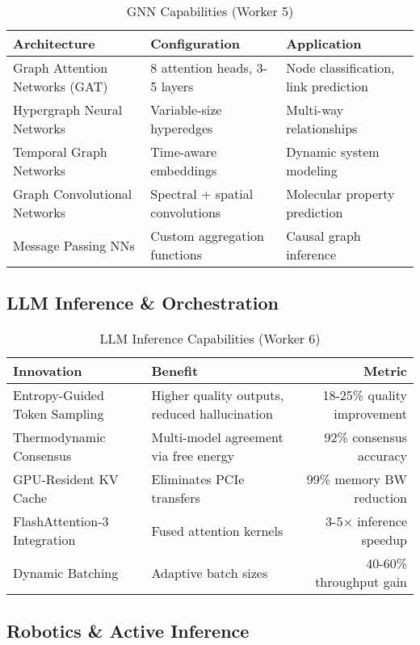 \documentclass[11pt,letterpaper]{article}
\begin{document}
\begin{table}[H]
\centering
\begin{tabularx}{\textwidth}{Xll}
\toprule
\textbf{Architecture} & \textbf{Configuration} & \textbf{Application} \\
\midrule
Graph Attention Networks (GAT) & 8 attention heads, 3-5 layers & Node classification, link prediction \\
Hypergraph Neural Networks & Variable-size hyperedges & Multi-way relationships \\
Temporal Graph Networks & Time-aware embeddings & Dynamic system modeling \\
Graph Convolutional Networks & Spectral + spatial convolutions & Molecular property prediction \\
Message Passing NNs & Custom aggregation functions & Causal graph inference \\
\bottomrule
\end{tabularx}
\caption{GNN Capabilities (Worker 5)}
\end{table}

\subsection{LLM Inference \& Orchestration}

\begin{table}[H]
\centering
\begin{tabularx}{\textwidth}{Xlr}
\toprule
\textbf{Innovation} & \textbf{Benefit} & \textbf{Metric} \\
\midrule
Entropy-Guided Token Sampling & Higher quality outputs, reduced hallucination & 18-25\% quality improvement \\
Thermodynamic Consensus & Multi-model agreement via free energy & 92\% consensus accuracy \\
GPU-Resident KV Cache & Eliminates PCIe transfers & 99\% memory BW reduction \\
FlashAttention-3 Integration & Fused attention kernels & 3-5× inference speedup \\
Dynamic Batching & Adaptive batch sizes & 40-60\% throughput gain \\
\bottomrule
\end{tabularx}
\caption{LLM Inference Capabilities (Worker 6)}
\end{table}

\newpage

\subsection{Robotics \& Active Inference}
\end{document}
